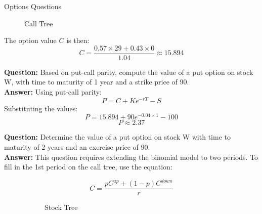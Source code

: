 \begin{examplebox}{Options Questions}
\begin{figure}[H]
      \caption{Call Tree}
\end{figure}

The option value \( C \) is then:
\[
C = \frac{0.57 \times 29 + 0.43 \times 0}{1.04} \approx 15.894
\]

\textbf{Question:} Based on put-call parity, compute the value of a put option on stock W, with time to maturity of 1 year and a strike price of 90.\\

\textbf{Answer:}
Using put-call parity:
\[
P = C + Ke^{-rT} - S
\]
Substituting the values:
\[
P = 15.894 + 90e^{-0.04 \times 1} - 100
\]
\[
P \approx 2.37
\]

\textbf{Question:} Determine the value of a put option on stock W with time to maturity of 2 years and an exercise price of 90.\\

\textbf{Answer:}
This question requires extending the binomial model to two periods. To fill in the 1st period on the call tree, use the equation:

\begin{equation}
    C = \frac{pC^{up}+(1-p)C^{down}}{r}
\end{equation}

\begin{figure}[H]
    \centering
    \begin{subfigure}[b]{0.48\textwidth}
        \centering
        \caption{Stock Tree}
    \end{subfigure}
    \begin{subfigure}[b]{0.48\textwidth}
        \centering
\end{subfigure}
\end{figure}
\end{examplebox}
